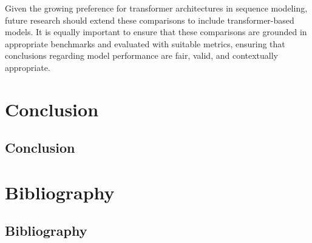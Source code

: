 \documentclass[
  letterpaper,
  double,
  12pt,
  1.0in]{beavtex}
\begin{document}
Given the growing preference for transformer architectures in sequence
modeling, future research should extend these comparisons to include
transformer-based models. It is equally important to ensure that these
comparisons are grounded in appropriate benchmarks and evaluated with
suitable metrics, ensuring that conclusions regarding model performance
are fair, valid, and contextually appropriate.

\part{Conclusion}

\chapter{Conclusion}\label{sec-conclusion}

\part{Bibliography}

\chapter*{Bibliography}\label{bibliography-1}

\end{document}
